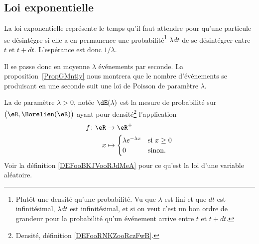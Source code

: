 \begin{center}
	
\end{center}

\subsection{Loi exponentielle}

La loi exponentielle représente le temps qu'il faut attendre pour qu'une particule se désintègre si elle a en permanence une probabilité\footnote{Plutôt une densité qu'une probabilité. Vu que \( \lambda\) est fini et que \( dt\) est infinitésimal, \( \lambda dt\) est infinitésimal, et si on veut c'est un bon ordre de grandeur pour la probabilité qu'un événement arrive entre \( t\) et \( t+dt\).} \( \lambda dt\) de se désintégrer entre \( t\) et \( t+dt\). L'espérance est donc \( 1/\lambda\).

Il se passe donc en moyenne \( \lambda\) événements par seconde. La proposition~\ref{PropGMntiy} nous montrera que le nombre d'événements se produisant en une seconde suit une loi de Poisson de paramètre \( \lambda\).

\begin{definition}       \label{DEFooTSFNooULWNHY}
	La  de paramètre \( \lambda>0\), notée \( \dE(\lambda)\) est la mesure de probabilité sur \( \big( \eR,\Borelien(\eR) \big)   \) ayant pour densité\footnote{Densité, définition \ref{DEFooRNKZooRczFwB}.} l'application
	\begin{equation}
		\begin{aligned}
			f\colon \eR & \to \eR^+ \\
			x           & \mapsto
			\begin{cases}
				\lambda e^{-\lambda x} & \text{si } x\geq 0 \\
				0                      & \text{sinon}.
			\end{cases}
		\end{aligned}
	\end{equation}
	Voir la définition \ref{DEFooBKJVooRJdMeA} pour ce qu'est la loi d'une variable aléatoire.
\end{definition}

